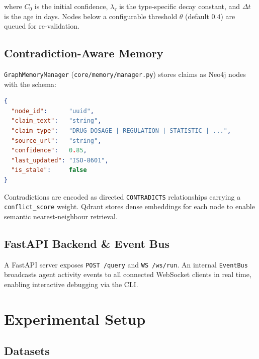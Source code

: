 \documentclass{article}
\begin{document}
where $C_0$ is the initial confidence, $\lambda_\tau$ is the type-specific
decay constant, and $\Delta t$ is the age in days.  Nodes below a configurable
threshold $\theta$ (default $0.4$) are queued for re-validation.

\subsection{Contradiction-Aware Memory}
\label{sec:memory}

\texttt{GraphMemoryManager} (\texttt{core/memory/manager.py}) stores claims as
Neo4j nodes with the schema:

\begin{lstlisting}[language=json]
{
  "node_id":      "uuid",
  "claim_text":   "string",
  "claim_type":   "DRUG_DOSAGE | REGULATION | STATISTIC | ...",
  "source_url":   "string",
  "confidence":   0.85,
  "last_updated": "ISO-8601",
  "is_stale":     false
}
\end{lstlisting}

Contradictions are encoded as directed \texttt{CONTRADICTS} relationships
carrying a \texttt{conflict\_score} weight.  Qdrant stores dense embeddings for
each node to enable semantic nearest-neighbour retrieval.

\subsection{FastAPI Backend \& Event Bus}
\label{sec:api}

A FastAPI server exposes \texttt{POST /query} and \texttt{WS /ws/run}.  An
internal \texttt{EventBus} broadcasts agent activity events to all connected
WebSocket clients in real time, enabling interactive debugging via the CLI.



\section{Experimental Setup}
\label{sec:experiments}

\subsection{Datasets}
\end{document}
